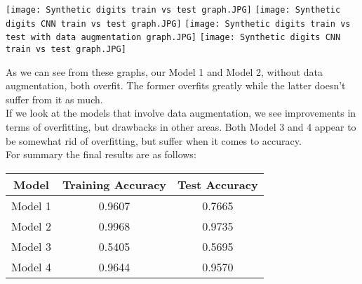 \documentclass[landscape,final,a0paper]{baposter}
\begin{document}
\begin{poster}
{\begin{minipage}[c]{6cm}
\texttt{[image: Synthetic digits train vs test graph.JPG]}
\texttt{[image: Synthetic digits CNN train vs test graph.JPG]}
\texttt{[image: Synthetic digits train vs test with data augmentation graph.JPG]}
\texttt{[image: Synthetic digits CNN train vs test graph.JPG]}
\end{minipage}
\begin{minipage}[c]{10cm}
As we can see from these graphs, our Model 1 and Model 2, without data augmentation, both overfit. The former overfits greatly while the latter doesn't suffer from it as much. \\
If we look at the models that involve data augmentation, we see improvements in terms of overfitting, but drawbacks in other areas.
Both Model 3 and 4 appear to be somewhat rid of overfitting, but suffer when it comes to accuracy.\\
For summary the final results are as follows:
\begin{tabular}{c|c c}
     Model & Training Accuracy & Test Accuracy  \\ \hline
    Model 1 & 0.9607 & 0.7665 \\
    Model 2 & 0.9968 & 0.9735 \\
    Model 3 & 0.5405 & 0.5695 \\
    Model 4 & 0.9644 & 0.9570
\end{tabular}


\end{minipage}
}

\end{poster}
\end{document}
